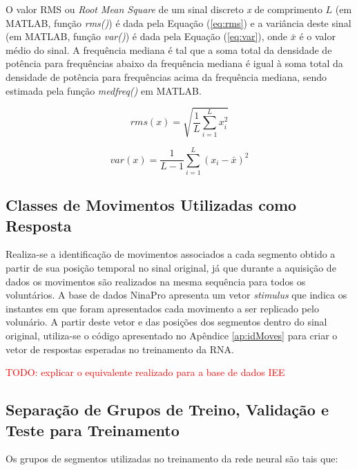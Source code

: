 O valor RMS ou \emph{Root Mean Square} de um sinal discreto \emph{x} de comprimento $L$ (em MATLAB, função \emph{rms()}) é dada pela Equação (\ref{eq:rms}) e a variância deste sinal (em MATLAB, função \emph{var()}) é dada pela Equação (\ref{eq:var}), onde $\bar{x}$ é o valor médio do sinal. A frequência mediana é tal que a soma total da densidade de potência para frequências abaixo da frequência mediana é igual à soma total da densidade de potência para frequências acima da frequência mediana, sendo estimada pela função \emph{medfreq()} em MATLAB.

\begin{equation}
	\label{eq:rms}
	rms(x) = \sqrt{\frac{1}{L}\sum\limits_{i=1}^{L}x_i^2} 
\end{equation}

\begin{equation}
	\label{eq:var}
	var(x) = \frac{1}{L-1}\sum\limits_{i=1}^{L}(x_i - \bar{x})^2
\end{equation}

			\subsection{Classes de Movimentos Utilizadas como Resposta}
Realiza-se a identificação de movimentos associados a cada segmento obtido a partir de sua posição temporal no sinal original, já que durante a aquisição de dados os movimentos são realizados na mesma sequência para todos os voluntários. A base de dados NinaPro apresenta um vetor \emph{stimulus} que indica os instantes em que foram apresentados cada movimento a ser replicado pelo volunário. A partir deste vetor e das posições dos segmentos dentro do sinal original, utiliza-se o código apresentado no Apêndice \ref{ap:idMoves} para criar o vetor de respostas esperadas no treinamento da RNA.

\textcolor{red}{TODO: explicar o equivalente realizado para a base de dados IEE}

			\subsection{Separação de Grupos de Treino, Validação e Teste para Treinamento}
Os grupos de segmentos utilizadas no treinamento da rede neural são tais que:

